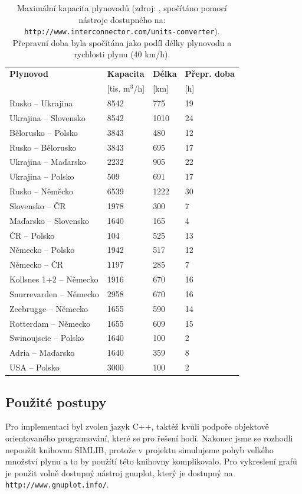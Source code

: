 \documentclass[a4paper,12pt]{article}
\begin{document}
  \begin{table}[h!]
  \centering
  \begin{tabular}{| l | l | l | l |}
    \hline
    \textbf{Plynovod} & \textbf{Kapacita} & \textbf{Délka} & \textbf{Přepr. doba}  \\
     & [tis. m$^3$/h] & [km] & [h] \\
    \hline\hline
    Rusko -- Ukrajina & 8542 & 775 & 19  \\ \hline
    Ukrajina -- Slovensko & 8542 & 1010 & 24 \\ \hline
    Bělorusko -- Polsko & 3843 & 480 & 12 \\ \hline
    Rusko -- Bělorusko & 3843 & 695 & 17 \\ \hline
    Ukrajina -- Maďarsko & 2232 & 905 & 22 \\ \hline
    Ukrajina -- Polsko & 509 & 691 & 17 \\ \hline
    Rusko -- Něměcko & 6539 & 1222 & 30 \\ \hline
    Slovensko -- ČR & 1978 & 300 & 7 \\ \hline
    Maďarsko -- Slovensko & 1640 & 165 & 4 \\ \hline
    ČR -- Polsko & 104 & 525 & 13 \\ \hline
    Německo -- Polsko & 1942 & 517 & 12 \\ \hline
    Německo -- ČR & 1197 & 285 & 7 \\ \hline
    Kollsnes 1+2 -- Německo & 1916 & 670 & 16 \\ \hline
    Snurrevarden -- Německo & 2958 & 670 & 16 \\ \hline
    Zeebrugge -- Německo & 1655 & 590 & 14 \\ \hline
    Rotterdam -- Německo & 1655 & 609 & 15 \\ \hline
    Swinoujscie -- Polsko & 1640 & 100 & 2 \\ \hline
    Adria -- Maďarsko & 1640 & 359 & 8 \\ \hline
    USA -- Polsko & 3000 & 100 & 2 \\
    \hline
  \end{tabular}
  \caption{Maximální kapacita plynovodů (zdroj: \cite{mapa2}, spočítáno pomocí nástroje dostupného na: 
  \texttt{http://www.interconnector.com/units-converter}). Přepravní doba byla spočítána jako podíl 
  délky plynovodu a rychlosti plynu (40 km/h).}
  \label{tab4}
  \end{table}
  
  \subsection{Použité postupy}
  Pro implementaci byl zvolen jazyk C++, taktéž kvůli podpoře objektově orientovaného programování, 
  které se pro řešení hodí. Nakonec jsme se rozhodli nepoužít knihovnu SIMLIB, protože v 
  projektu simulujeme pohyb velkého množství plynu a to by použítí této knihovny komplikovalo. Pro vykreslení 
  grafů je použit volně dostupný nástroj gnuplot, který je dostupný na \texttt{http://www.gnuplot.info/}.
  
\end{document}

